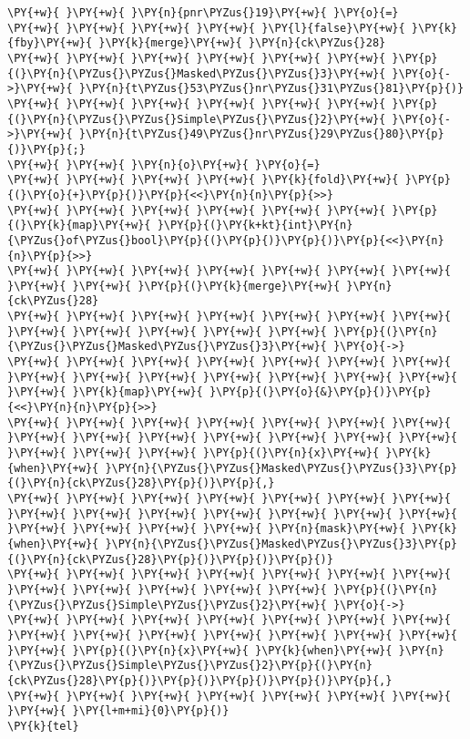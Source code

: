 \begin{Verbatim}[commandchars=\\\{\}]
\PY{+w}{ }\PY{+w}{ }\PY{n}{pnr\PYZus{}19}\PY{+w}{ }\PY{o}{=}
\PY{+w}{ }\PY{+w}{ }\PY{+w}{ }\PY{+w}{ }\PY{l}{false}\PY{+w}{ }\PY{k}{fby}\PY{+w}{ }\PY{k}{merge}\PY{+w}{ }\PY{n}{ck\PYZus{}28}
\PY{+w}{ }\PY{+w}{ }\PY{+w}{ }\PY{+w}{ }\PY{+w}{ }\PY{+w}{ }\PY{p}{(}\PY{n}{\PYZus{}\PYZus{}Masked\PYZus{}\PYZus{}3}\PY{+w}{ }\PY{o}{->}\PY{+w}{ }\PY{n}{t\PYZus{}53\PYZus{}nr\PYZus{}31\PYZus{}81}\PY{p}{)}
\PY{+w}{ }\PY{+w}{ }\PY{+w}{ }\PY{+w}{ }\PY{+w}{ }\PY{+w}{ }\PY{p}{(}\PY{n}{\PYZus{}\PYZus{}Simple\PYZus{}\PYZus{}2}\PY{+w}{ }\PY{o}{->}\PY{+w}{ }\PY{n}{t\PYZus{}49\PYZus{}nr\PYZus{}29\PYZus{}80}\PY{p}{)}\PY{p}{;}
\PY{+w}{ }\PY{+w}{ }\PY{n}{o}\PY{+w}{ }\PY{o}{=}
\PY{+w}{ }\PY{+w}{ }\PY{+w}{ }\PY{+w}{ }\PY{k}{fold}\PY{+w}{ }\PY{p}{(}\PY{o}{+}\PY{p}{)}\PY{p}{<<}\PY{n}{n}\PY{p}{>>}
\PY{+w}{ }\PY{+w}{ }\PY{+w}{ }\PY{+w}{ }\PY{+w}{ }\PY{+w}{ }\PY{p}{(}\PY{k}{map}\PY{+w}{ }\PY{p}{(}\PY{k+kt}{int}\PY{n}{\PYZus{}of\PYZus{}bool}\PY{p}{(}\PY{p}{)}\PY{p}{)}\PY{p}{<<}\PY{n}{n}\PY{p}{>>}
\PY{+w}{ }\PY{+w}{ }\PY{+w}{ }\PY{+w}{ }\PY{+w}{ }\PY{+w}{ }\PY{+w}{ }\PY{+w}{ }\PY{+w}{ }\PY{p}{(}\PY{k}{merge}\PY{+w}{ }\PY{n}{ck\PYZus{}28}
\PY{+w}{ }\PY{+w}{ }\PY{+w}{ }\PY{+w}{ }\PY{+w}{ }\PY{+w}{ }\PY{+w}{ }\PY{+w}{ }\PY{+w}{ }\PY{+w}{ }\PY{+w}{ }\PY{+w}{ }\PY{p}{(}\PY{n}{\PYZus{}\PYZus{}Masked\PYZus{}\PYZus{}3}\PY{+w}{ }\PY{o}{->}
\PY{+w}{ }\PY{+w}{ }\PY{+w}{ }\PY{+w}{ }\PY{+w}{ }\PY{+w}{ }\PY{+w}{ }\PY{+w}{ }\PY{+w}{ }\PY{+w}{ }\PY{+w}{ }\PY{+w}{ }\PY{+w}{ }\PY{+w}{ }\PY{+w}{ }\PY{k}{map}\PY{+w}{ }\PY{p}{(}\PY{o}{&}\PY{p}{)}\PY{p}{<<}\PY{n}{n}\PY{p}{>>}
\PY{+w}{ }\PY{+w}{ }\PY{+w}{ }\PY{+w}{ }\PY{+w}{ }\PY{+w}{ }\PY{+w}{ }\PY{+w}{ }\PY{+w}{ }\PY{+w}{ }\PY{+w}{ }\PY{+w}{ }\PY{+w}{ }\PY{+w}{ }\PY{+w}{ }\PY{+w}{ }\PY{+w}{ }\PY{p}{(}\PY{n}{x}\PY{+w}{ }\PY{k}{when}\PY{+w}{ }\PY{n}{\PYZus{}\PYZus{}Masked\PYZus{}\PYZus{}3}\PY{p}{(}\PY{n}{ck\PYZus{}28}\PY{p}{)}\PY{p}{,}
\PY{+w}{ }\PY{+w}{ }\PY{+w}{ }\PY{+w}{ }\PY{+w}{ }\PY{+w}{ }\PY{+w}{ }\PY{+w}{ }\PY{+w}{ }\PY{+w}{ }\PY{+w}{ }\PY{+w}{ }\PY{+w}{ }\PY{+w}{ }\PY{+w}{ }\PY{+w}{ }\PY{+w}{ }\PY{+w}{ }\PY{n}{mask}\PY{+w}{ }\PY{k}{when}\PY{+w}{ }\PY{n}{\PYZus{}\PYZus{}Masked\PYZus{}\PYZus{}3}\PY{p}{(}\PY{n}{ck\PYZus{}28}\PY{p}{)}\PY{p}{)}\PY{p}{)}
\PY{+w}{ }\PY{+w}{ }\PY{+w}{ }\PY{+w}{ }\PY{+w}{ }\PY{+w}{ }\PY{+w}{ }\PY{+w}{ }\PY{+w}{ }\PY{+w}{ }\PY{+w}{ }\PY{+w}{ }\PY{p}{(}\PY{n}{\PYZus{}\PYZus{}Simple\PYZus{}\PYZus{}2}\PY{+w}{ }\PY{o}{->}
\PY{+w}{ }\PY{+w}{ }\PY{+w}{ }\PY{+w}{ }\PY{+w}{ }\PY{+w}{ }\PY{+w}{ }\PY{+w}{ }\PY{+w}{ }\PY{+w}{ }\PY{+w}{ }\PY{+w}{ }\PY{+w}{ }\PY{+w}{ }\PY{+w}{ }\PY{p}{(}\PY{n}{x}\PY{+w}{ }\PY{k}{when}\PY{+w}{ }\PY{n}{\PYZus{}\PYZus{}Simple\PYZus{}\PYZus{}2}\PY{p}{(}\PY{n}{ck\PYZus{}28}\PY{p}{)}\PY{p}{)}\PY{p}{)}\PY{p}{)}\PY{p}{,}
\PY{+w}{ }\PY{+w}{ }\PY{+w}{ }\PY{+w}{ }\PY{+w}{ }\PY{+w}{ }\PY{+w}{ }\PY{+w}{ }\PY{l+m+mi}{0}\PY{p}{)}
\PY{k}{tel}
\end{Verbatim}
